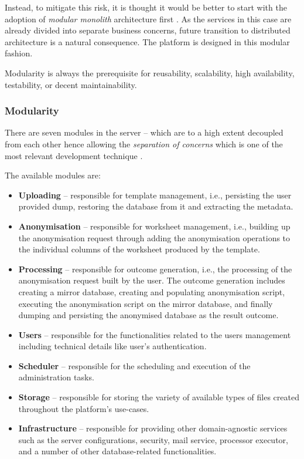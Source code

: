 \documentclass[a4paper,twoside,12pt]{book}
\begin{document}
Instead, to mitigate this risk, it is thought it would be better to start with the adoption of \textit{modular monolith} architecture first \cite{bib:boiling_frogs_modularity}. As the services in this case are already divided into separate business concerns, future transition to distributed architecture is a natural consequence. The platform is designed in this modular fashion.

Modularity is always the prerequisite for reusability, scalability, high availability, testability, or decent maintainability.

\subsubsection{Modularity}

There are seven modules in the server -- which are to a high extent decoupled from each other hence allowing the \textit{separation of concerns} which is one of the most relevant development technique \cite{bib:clean_code}.

The available modules are:
\begin{itemize}
\item \textbf{Uploading} -- responsible for template management, i.e., persisting the user provided dump, restoring the database from it and extracting the metadata.
\item \textbf{Anonymisation} -- responsible for worksheet management, i.e., building up the anonymisation request through adding the anonymisation operations to the individual columns of the worksheet produced by the template.
\item \textbf{Processing} -- responsible for outcome generation, i.e., the processing of the anonymisation request built by the user. The outcome generation includes creating a mirror database, creating and populating anonymisation script, executing the anonymisation script on the mirror database, and finally dumping and persisting the anonymised database as the result outcome.
\item \textbf{Users} -- responsible for the functionalities related to the users management including technical details like user's authentication.
\item \textbf{Scheduler} -- responsible for the scheduling and execution of the administration tasks.
\item \textbf{Storage} -- responsible for storing the variety of available types of files created throughout the platform's use-cases.
\item \textbf{Infrastructure} -- responsible for providing other domain-agnostic services such as the server configurations, security, mail service, processor executor, and a number of other database-related functionalities.

\end{itemize}
\end{document}

